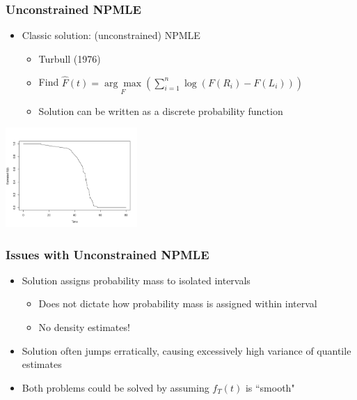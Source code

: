 \documentclass[compress,red]{beamer}
\begin{document}
\begin{frame}

\frametitle{Unconstrained NPMLE}

	\begin{itemize}
	
	\item Classic solution: (unconstrained) NPMLE
	
		\begin{itemize}
		
		\item Turbull (1976)
		
		\item Find $\hat F(t) = \underset{F} {\arg \max} \left( \displaystyle \sum_{i = 1}^n \log( F(R_i) - F(L_i) )  \right)$
		
		\item Solution can be written as a discrete probability function
				
		\end{itemize}
	
	\end{itemize}

\centerline{ \includegraphics[width = 5cm]{UC_Splot.pdf} }

\end{frame}

\begin{frame}

\frametitle{Issues with Unconstrained NPMLE}

	\begin{itemize}
	
	\item Solution assigns probability mass to isolated intervals
	
		\begin{itemize}
		
		\item Does not dictate how probability mass is assigned within interval
		
		\item No density estimates!
		
		\end{itemize}
		
	\item Solution often jumps erratically, causing excessively high variance of quantile estimates
	
	\item Both problems could be solved by assuming $f_T(t)$ is ``smooth"
	
	\end{itemize}

\end{frame}
\end{document}
